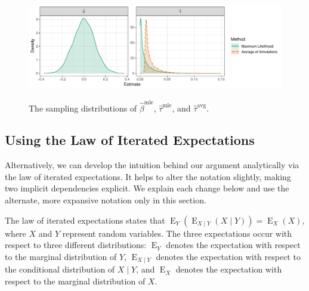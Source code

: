 \documentclass[11pt]{article}
\DeclareMathOperator*{\E}{\text{E}}
\begin{document}
\begin{figure}[h]
\begin{center}
\includegraphics[width=\textwidth]{figs/intuition-sampling.pdf}\\
\vspace{.1in}
\caption{The sampling distributions of $\hat{\beta}^\text{mle}$, $\hat{\tau}^\text{mle}$, and $\hat{\tau}^\text{avg}$.}\label{fig:int-samp}
\end{center}
\end{figure}

\subsection*{Using the Law of Iterated Expectations}

Alternatively, we can develop the intuition behind our argument analytically via the law of iterated expectations. It helps to alter the notation slightly, making two implicit dependencies explicit. We explain each change below and use the alternate, more expansive notation only in this section.

The law of iterated expectations states that $\E_Y \left( \E_{X \mid Y}(X \mid Y) \right) = \E_X(X)$, where $X$ and $Y$ represent random variables.
The three expectations occur with respect to three different distributions: $\E_Y$ denotes the expectation with respect to the marginal distribution of $Y$, $\E_{X \mid Y}$ denotes the expectation with respect to the conditional distribution of $X \mid Y$, and $\E_X$ denotes the expectation with respect to the marginal distribution of $X$.
\end{document}
